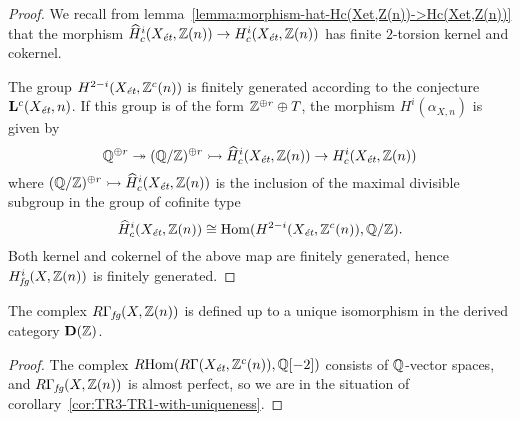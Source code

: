 \documentclass{article}
\numberwithin{equation}{section}
\begin{document}
\begin{proposition}
\begin{proof}
    We recall from lemma~\ref{lemma:morphism-hat-Hc(Xet,Z(n))->Hc(Xet,Z(n))}
    that the morphism
    $\widehat{H}^i_c (X_\et, \ZZ (n)) \to H^i_c (X_\et, \ZZ (n))$ has finite
    $2$-torsion kernel and cokernel.

    The group $H^{2-i} (X_\et, \ZZ^c (n))$ is finitely generated
    according to the conjecture $\mathbf{L}^c (X_\et, n)$. If this
    group is of the form $\ZZ^{\oplus r}\oplus T$, the morphism
    $H^i (\alpha_{X,n})$ is given by
    \[ \QQ^{\oplus r} \twoheadrightarrow
      (\QQ/\ZZ)^{\oplus r} \rightarrowtail
      \widehat{H}^i_c (X_\et, \ZZ (n)) \to
      H^i_c (X_\et, \ZZ (n)) \]
    where
    $(\QQ/\ZZ)^{\oplus r} \rightarrowtail \widehat{H}^i_c (X_\et, \ZZ (n))$ is
    the inclusion of the maximal divisible subgroup in the group of cofinite
    type
    $$\widehat{H}^i_c (X_\et, \ZZ (n)) \cong \Hom (H^{2-i} (X_\et, \ZZ^c (n)), \QQ/\ZZ).$$
    Both kernel and cokernel of the above map are finitely generated, hence
    $H^i_\fg (X, \ZZ (n))$ is finitely generated.
  \end{proof}
\end{proposition}

\begin{proposition}
  \label{prop:RGamma-fg-uniquely-defined}
  The complex $R\Gamma_\fg (X, \ZZ (n))$ is defined up to a unique isomorphism
  in the derived category $\mathbf{D} (\ZZ)$.

  \begin{proof}
    The complex $\RHom (R\Gamma (X_\et, \ZZ^c (n)), \QQ [-2])$ consists of
    $\QQ$-vector spaces, and $R\Gamma_\fg (X, \ZZ (n))$ is almost perfect, so we
    are in the situation of corollary~\ref{cor:TR3-TR1-with-uniqueness}.
  \end{proof}
\end{proposition}
\end{document}
